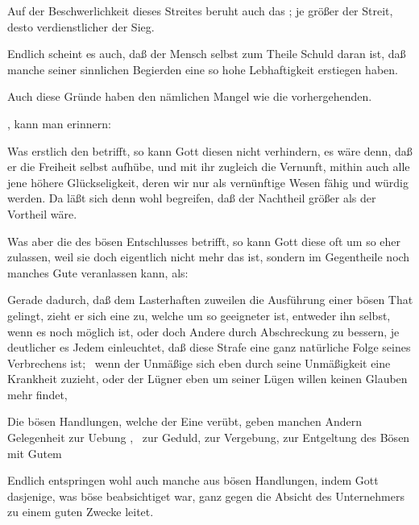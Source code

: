 \begin{aufza}
\begin{aufzb}
\begin{aufzc}
\item  Auf der Beschwerlichkeit dieses Streites beruht auch das ; je größer der Streit, desto verdienstlicher der Sieg.
\item  Endlich scheint es auch, daß der Mensch selbst zum Theile Schuld daran ist, daß manche seiner sinnlichen Begierden eine so hohe Lebhaftigkeit erstiegen haben.
\end{aufzc}
Auch diese Gründe haben den nämlichen Mangel wie die vorhergehenden.
\item {}, kann man erinnern:
\begin{aufzc}
\item Was erstlich den  betrifft, so kann Gott diesen nicht verhindern, es wäre denn, daß er die Freiheit selbst aufhübe, und mit ihr zugleich die Vernunft, mithin auch alle jene höhere Glückseligkeit, deren wir nur als vernünftige Wesen fähig und würdig werden. Da läßt sich denn wohl begreifen, daß der Nachtheil größer als der Vortheil wäre.
\item  Was aber die  des bösen Entschlusses betrifft, so kann Gott diese oft um so eher zulassen, weil sie doch eigentlich nicht mehr das  ist, sondern im Gegentheile noch manches Gute veranlassen kann, als: 
\begin{aufzb}[a.]
\item Gerade dadurch, daß dem Lasterhaften zuweilen die Ausführung einer bösen That gelingt, zieht er sich eine  zu, welche um so geeigneter ist, entweder ihn selbst, wenn es noch möglich ist, oder doch Andere durch Abschreckung zu bessern, je deutlicher es Jedem einleuchtet, daß diese Strafe eine ganz natürliche Folge seines Verbrechens ist; \zB\ wenn der Unmäßige sich eben durch seine Unmäßigkeit eine Krankheit zuzieht, oder der Lügner eben um seiner Lügen willen keinen Glauben mehr findet, \udgl 
\item Die bösen Handlungen, welche der Eine verübt, geben manchen Andern Gelegenheit zur Uebung , \zB\ zur Geduld, zur Vergebung, zur Entgeltung des Bösen mit Gutem \usw
\item Endlich entspringen wohl auch manche  aus bösen Handlungen, indem Gott dasjenige, was böse beabsichtiget war, ganz gegen die Absicht des Unternehmers zu einem guten Zwecke leitet.\end{aufzb}\par

\end{aufzc}
\end{aufzb}
\end{aufza}
